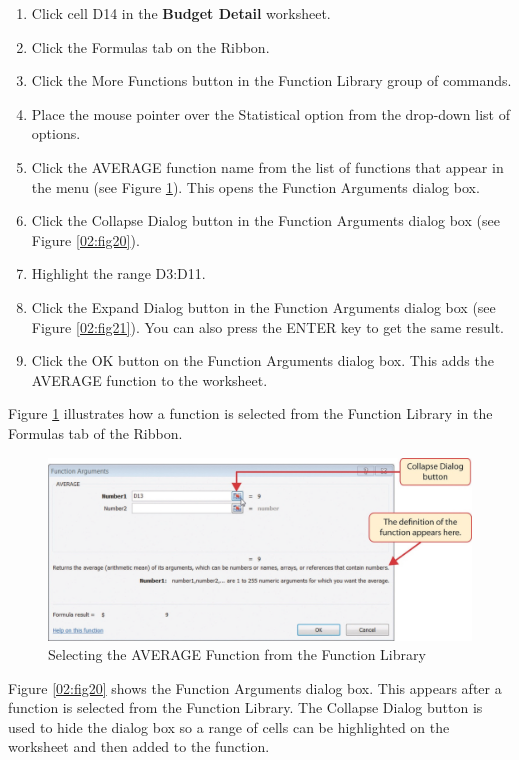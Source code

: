 \begin{enumerate}
	\item Click cell \textsf{D14} in the \textbf{Budget Detail} worksheet.
	\item Click the Formulas tab on the Ribbon.
	\item Click the More Functions button in the Function Library group of commands.
	\item Place the mouse pointer over the Statistical option from the drop-down list of options.
	\item Click the AVERAGE function name from the list of functions that appear in the menu (see Figure \ref{02:fig19}). This opens the Function Arguments dialog box.
	\item Click the Collapse Dialog button in the Function Arguments dialog box (see Figure \ref{02:fig20}).
	\item Highlight the range \textsf{D3:D11}.
	\item Click the Expand Dialog button in the Function Arguments dialog box (see Figure \ref{02:fig21}). You can also press the ENTER key to get the same result.
	\item Click the OK button on the Function Arguments dialog box. This adds the AVERAGE function to the worksheet.
\end{enumerate}

Figure \ref{02:fig19} illustrates how a function is selected from the Function Library in the Formulas tab of the Ribbon.

\begin{figure}[H]
	\centering
	\includegraphics[width=\maxwidth{.95\linewidth}]{gfx/ch02_fig19}
	\caption{Selecting the AVERAGE Function from the Function Library}
	\label{02:fig19}
\end{figure}

Figure \ref{02:fig20} shows the Function Arguments dialog box. This appears after a function is selected from the Function Library. The Collapse Dialog button is used to hide the dialog box so a range of cells can be highlighted on the worksheet and then added to the function.

